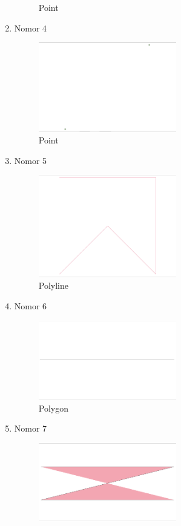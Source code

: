 \begin{enumerate}
\begin{figure}[H]
		\centering
		\caption{Point}
	\end{figure}
	\item Nomor 4
	
	\begin{figure}[H]
		\includegraphics[width=6cm]{figures/Tugas2/1174084/no4.png}
		\centering
		\caption{Point}
	\end{figure}
	\item Nomor 5
	
	\begin{figure}[H]
		\includegraphics[width=6cm]{figures/Tugas2/1174084/no5.png}
		\centering
		\caption{Polyline}
	\end{figure}
	\item Nomor 6
	
	\begin{figure}[H]
		\includegraphics[width=6cm]{figures/Tugas2/1174084/no6.png}
		\centering
		\caption{Polygon}
	\end{figure}
	\item Nomor 7
	
	\begin{figure}[H]
		\includegraphics[width=6cm]{figures/Tugas2/1174084/no7.png}

\end{figure}
\end{enumerate}
